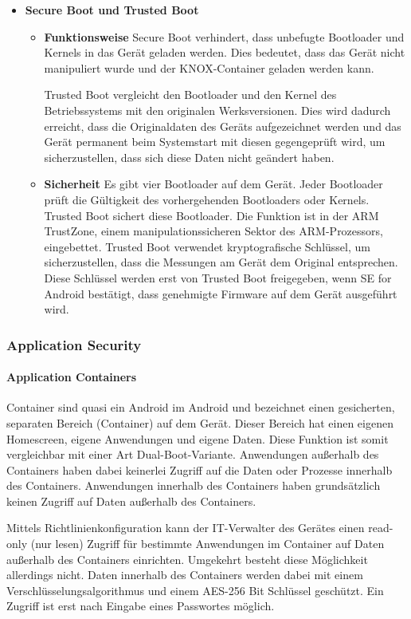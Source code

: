 \begin{itemize}
\begin{itemize}
	\end{itemize}
	\item \textbf{Secure Boot und Trusted Boot}
	\begin{itemize}
		\item \textbf{Funktionsweise} \newline Secure Boot verhindert, dass unbefugte Bootloader und Kernels in das Gerät geladen werden. Dies bedeutet, dass das Gerät nicht manipuliert wurde und der KNOX-Container geladen werden kann. \par Trusted Boot vergleicht den Bootloader und den Kernel des Betriebssystems mit den originalen Werksversionen. Dies wird dadurch erreicht, dass die Originaldaten des Geräts aufgezeichnet werden und das Gerät permanent beim Systemstart mit diesen gegengeprüft wird, um sicherzustellen, dass sich diese Daten nicht geändert haben.
		\item \textbf{Sicherheit} \newline Es gibt vier Bootloader auf dem Gerät. Jeder Bootloader prüft die Gültigkeit des vorhergehenden Bootloaders oder Kernels. Trusted Boot sichert diese Bootloader. Die Funktion ist in der ARM TrustZone, einem manipulationssicheren Sektor des ARM-Prozessors, eingebettet. Trusted Boot verwendet kryptografische Schlüssel, um sicherzustellen, dass die Messungen am Gerät dem Original entsprechen. Diese Schlüssel werden erst von Trusted Boot freigegeben, wenn SE for Android bestätigt, dass genehmigte Firmware auf dem Gerät ausgeführt wird.
	\end{itemize}
\end{itemize}

\subsubsection{Application Security}
\paragraph{Application Containers}
Container sind quasi ein Android im Android und bezeichnet einen gesicherten, separaten Bereich (Container) auf dem Gerät. Dieser Bereich hat einen eigenen Homescreen, eigene Anwendungen und eigene Daten. Diese Funktion ist somit vergleichbar mit einer Art Dual-Boot-Variante. Anwendungen außerhalb des Containers haben dabei keinerlei Zugriff auf die Daten oder Prozesse innerhalb des Containers. Anwendungen innerhalb des Containers haben grundsätzlich keinen Zugriff auf Daten außerhalb des Containers. 
\par 
Mittels Richtlinienkonfiguration kann der IT-Verwalter des Gerätes einen read-only (nur lesen) Zugriff für bestimmte Anwendungen im Container auf Daten außerhalb des Containers einrichten. Umgekehrt besteht diese Möglichkeit allerdings nicht. Daten innerhalb des Containers werden dabei mit einem Verschlüsselungsalgorithmus und einem AES-256 Bit Schlüssel geschützt. Ein Zugriff ist erst nach Eingabe eines Passwortes möglich.
